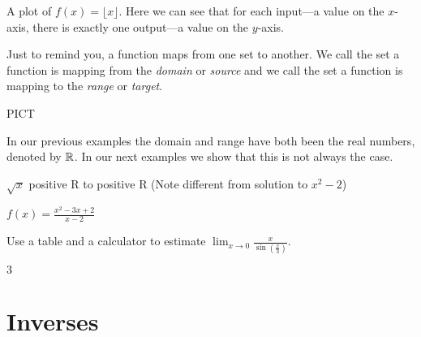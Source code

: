 \begin{marginfigure}[0in]
\caption{A plot of $f(x)=\lfloor x\rfloor$. Here we can see that for each input---a
  value on the $x$-axis, there is exactly one output---a value on the
  $y$-axis.}
\label{plot:greatest-integer fxn}
\end{marginfigure}


Just to remind you, a function maps from one set to another. We call
the set a function is mapping from the \textit{domain} or
\textit{source} and we call the set a function is mapping to the
\textit{range} or \textit{target}.

PICT


In our previous examples the domain and range have both been the real
numbers, denoted by $\mathbb{R}$. In our next examples we show that this is
not always the case.


\begin{example}
$\sqrt{x}$ positive R to positive R (Note different from solution to $x^2 -2$)
\end{example}



\begin{example}
$f(x) = \frac{x^2 - 3x + 2}{x-2}$
\end{example}



\begin{exercises}

\begin{exercise} 
Use a table and a calculator to estimate $\lim_{x\to 0} \frac{x}{\sin\left(\frac{x}{3}\right)}$.
\begin{answer}
  $3$
\end{answer}
\end{exercise}

\end{exercises}




\section{Inverses}

